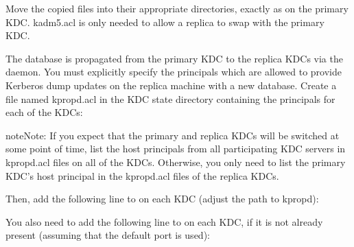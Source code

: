 \documentclass[letterpaper,10pt,english]{sphinxmanual}
\begin{document}
Move the copied files into their appropriate directories, exactly as
on the primary KDC.  kadm5.acl is only needed to allow a replica to
swap with the primary KDC.

The database is propagated from the primary KDC to the replica KDCs
via the {\hyperref[\detokenize{admin/admin_commands/kpropd:kpropd-8}]{}} daemon.  You must explicitly specify the
principals which are allowed to provide Kerberos dump updates on the
replica machine with a new database.  Create a file named kpropd.acl
in the KDC state directory containing the  principals for each
of the KDCs:

%
\begin{sphinxVerbatim}[commandchars=\\\{\}]
\end{sphinxVerbatim}

\begin{sphinxadmonition}{note}{Note:}
If you expect that the primary and replica KDCs will be
switched at some point of time, list the host principals
from all participating KDC servers in kpropd.acl files on
all of the KDCs.  Otherwise, you only need to list the
primary KDC’s host principal in the kpropd.acl files of the
replica KDCs.
\end{sphinxadmonition}

Then, add the following line to  on each KDC
(adjust the path to kpropd):

%
\begin{sphinxVerbatim}[commandchars=\\\{\}]
      
\end{sphinxVerbatim}

You also need to add the following line to  on each
KDC, if it is not already present (assuming that the default port is
used):

%
\begin{sphinxVerbatim}[commandchars=\\\{\}]
                      
\end{sphinxVerbatim}
\end{document}
